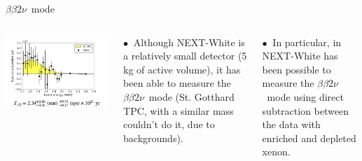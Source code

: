 \documentclass [aspectratio=169]{beamer}
\newcommand{\bbtnu}{\ensuremath{\beta\beta2\nu}}
\begin{document}
\begin{frame}{\bbtnu\ mode}
\begin{columns}
\includegraphics[scale=0.36]{bb2nu.png}

$\bullet~$ Although NEXT-White is a relatively small detector (5 kg of active volume), it has been able to measure the \bbtnu\ mode (St. Gotthard TPC, with a similar mass couldn't do it, due to backgrounds). 

$\bullet~$ In particular, in NEXT-White has been possible to measure the \bbtnu\ mode using direct subtraction between the data with enriched and depleted xenon. 
 \end{columns}
\end{frame}

%
%
%
% 









\end{document}
